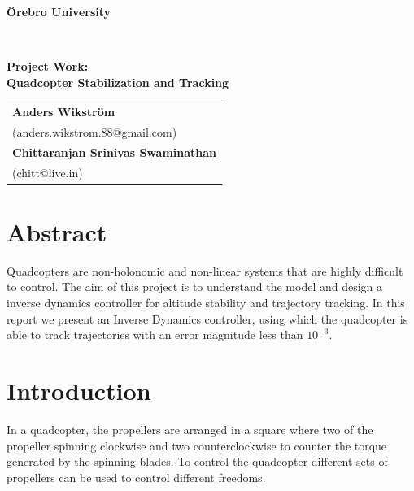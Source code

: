 \documentclass[12pt,fleqn]{article}
\begin{document}
\thispagestyle{empty}
\noindent\makebox[\linewidth]{\rule{.75\paperwidth}{0.4pt}}
\begin{center}
{\Large \textbf{{\"O}rebro University}}
\end{center}
\vspace{-4mm}
\noindent\makebox[\linewidth]{\rule{.75\paperwidth}{0.4pt}} \\
\vspace{4cm}
\begin{center}
{\Large\sffamily\bfseries
Project Work: \\[1ex]
Quadcopter Stabilization and Tracking \\[2ex]
}

\vspace{6cm}
\noindent\makebox[\linewidth]{\rule{.75\paperwidth}{0.4pt}}
{\large
\renewcommand{\arraystretch}{1.5}
  \begin{tabular}{l}
   \textbf{Anders Wikstr\"{o}m}\\
   (anders.wikstrom.88@gmail.com)\\
   \textbf{Chittaranjan Srinivas Swaminathan}\\
   (chitt@live.in)\\
 \end{tabular}}
\end{center}
\vspace{-2mm}
\noindent\makebox[\linewidth]{\rule{.75\paperwidth}{0.4pt}}
\newpage

\tableofcontents

\newpage



\section*{Abstract}
Quadcopters are non-holonomic and non-linear systems that are highly
difficult to control. The aim of this project is to understand the
model and design a inverse dynamics controller for altitude stability
and trajectory tracking. In this report we present an Inverse Dynamics
controller, using which the quadcopter is able to track trajectories
with an error magnitude less than $10^{-3}$. 

\section{Introduction}

In a quadcopter, the propellers are arranged in a square where two of the propeller spinning clockwise and two counterclockwise to counter the torque generated by the spinning blades. To control the quadcopter different sets of propellers can be used to control different freedoms.
\end{document}
